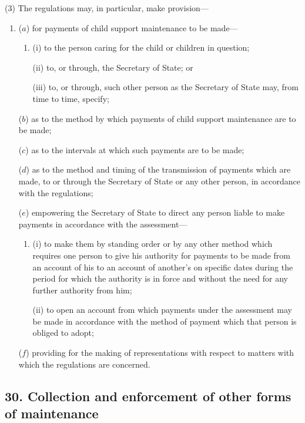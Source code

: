 \documentclass[12pt,a4paper]{article}
\begin{document}
(3) The regulations may, in particular, make provision—
\begin{enumerate}\item[]
($a$) for payments of child support maintenance to be made—
\begin{enumerate}\item[]
(i) to the person caring for the child or children in question;

(ii) to, or through, the Secretary of State; or

(iii) to, or through, such other person as the Secretary of State may, from time to time, specify;
\end{enumerate}

($b$) as to the method by which payments of child support maintenance are to be made;

($c$) as to the intervals at which such payments are to be made;

($d$) as to the method and timing of the transmission of payments which are made, to or through the Secretary of State or any other person, in accordance with the regulations;

($e$) empowering the Secretary of State to direct any person liable to make payments in accordance with the assessment—
\begin{enumerate}\item[]
(i) to make them by standing order or by any other method which requires one person to give his authority for payments to be made from an account of his to an account of another’s on specific dates during the period for which the authority is in force and without the need for any further authority from him;

(ii) to open an account from which payments under the assessment may be made in accordance with the method of payment which that person is obliged to adopt;
\end{enumerate}

($f$) providing for the making of representations with respect to matters with which the regulations are concerned.
\end{enumerate}


\subsection{30. Collection and enforcement of other forms of maintenance}
\end{document}
